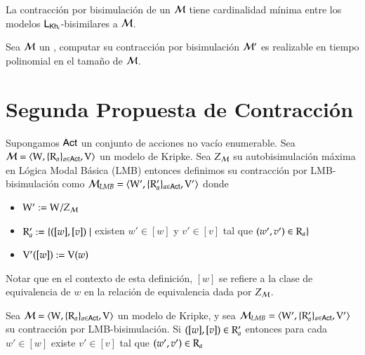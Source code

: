 \begin{teorema}
    La contracción por bisimulación de un \ults $\mathcal{M}$ tiene cardinalidad mínima entre los modelos $\mathsf{L}_{\mathsf{Kh}_i}$-bisimilares a $\mathcal{M}$.
\end{teorema}


\begin{teorema}
    Sea $\mathcal{M}$ un \ults, computar su contracción por bisimulación $\mathcal{M}'$ es realizable en tiempo polinomial en el 
    tamaño de $\mathcal{M}$.
\end{teorema}


\section{Segunda Propuesta de Contracción}

\begin{definicion}
    Supongamos ${\rm \sf Act}$ un conjunto de acciones no vacío enumerable.
    Sea $\mathcal{M} = \langle \mathrm{W},\{\mathrm{R}_a\}_{a\in{\rm \sf Act}},\mathrm{V} \rangle$ un modelo de Kripke. Sea $Z_{\mathcal{M}}$ su autobisimulación máxima en Lógica Modal Básica (LMB) entonces definimos su contracción por LMB-bisimulación como $\mathcal{M}_{LMB} = \langle \mathrm{W}',\{\mathrm{R}'_a\}_{a\in{\rm \sf Act}},\mathrm{V}' \rangle$ donde
    \begin{center}
        \begin{itemize}
            \item $\mathrm{W}' := \mathrm{W} /Z_{\mathcal{M}}$
            \item $\mathrm{R}_a' := \{([w],[v]) \mid$ existen $w' \in [w]$ y $v' \in [v]$ tal que $(w',v') \in \mathrm{R}_a \}$
            \item $\mathrm{V}'([w]) := \mathrm{V}(w)$
        \end{itemize}
    \end{center} 
\end{definicion}

Notar que en el contexto de esta definición, $[w]$ se refiere a la clase de equivalencia de $w$ en la relación de equivalencia dada por $Z_{\mathcal{M}}$. 


\begin{lema}
    Sea $\mathcal{M} = \langle \mathrm{W},\{\mathrm{R}_a\}_{a\in{\rm \sf Act}},\mathrm{V} \rangle$ un modelo de Kripke, y sea $\mathcal{M}_{LMB} = \langle \mathrm{W}',\{\mathrm{R}_a'\}_{a\in{\rm \sf Act}},\mathrm{V}' \rangle$ su contracción por LMB-bisimulación.
    Si $([w],[v]) \in \mathrm{R}'_a$ entonces para cada $w' \in [w]$ existe $v' \in [v]$ tal que $(w',v') \in \mathrm{R}_a$
\end{lema}



